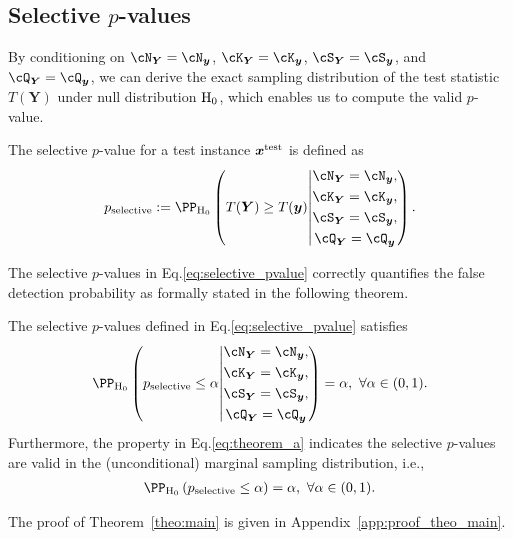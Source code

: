 \subsection{Selective $p$-values}
%
By conditioning on
$\cN_{\bm Y} = \cN_{\bm y}$,
$\cK_{\bm Y} = \cK_{\bm y}$,
$\cS_{\bm Y} = \cS_{\bm y}$,
and 
$\cQ_{\bm Y} = \cQ_{\bm y}$,
we can derive the exact sampling distribution of the test statistic $T(\bm Y)$ under null distribution ${\rm H}_0$, which enables us to compute the valid $p$-value.
%
\begin{definition}
 The selective $p$-value for a test instance $\bm x^{\rm test}$ is defined as
 \begin{align}
  \label{eq:selective_pvalue}
  p_{\rm selective}
  :=
  \PP_{\rm H_0}
  \left(
  T(\bm Y) \ge T(\bm y)
  \middle |
  \begin{gathered}
   \cN_{\bm{Y}} = \cN_{\bm{y}},\\
   \cK_{\bm{Y}} = \cK_{\bm{y}},\\
   \cS_{\bm{Y}} = \cS_{\bm{y}},\\
   \cQ_{\bm{Y}} = \cQ_{\bm{y}}
  \end{gathered}
  \right).
 \end{align}
\end{definition}
%
The selective $p$-values in Eq.\eqref{eq:selective_pvalue} correctly quantifies the false detection probability as formally stated in the following theorem.
%
\begin{theorem}
 \label{theo:main}
 The selective $p$-values defined in Eq.\eqref{eq:selective_pvalue} satisfies
 \begin{align}
  \label{eq:theorem_a}
  \PP_{\rm H_0}
  \left(
  p_{\rm selective}
  \le
  \alpha
  \middle |
  \begin{gathered}
   \cN_{\bm{Y}} = \cN_{\bm{y}},\\
   \cK_{\bm{Y}} = \cK_{\bm{y}},\\
   \cS_{\bm{Y}} = \cS_{\bm{y}},\\
   \cQ_{\bm{Y}} = \cQ_{\bm{y}}
  \end{gathered}
  \right)
  =
  \alpha,
  ~
  \forall \alpha \in (0, 1).
 \end{align}
 Furthermore, the property in Eq.\eqref{eq:theorem_a} indicates the selective $p$-values are valid in the (unconditional) marginal sampling distribution, i.e., 
 \begin{align}
  \label{eq:theorem_b}
  \PP_{\rm H_0}
  \left(
  p_{\rm selective}
  \le
  \alpha
  \right)
  =
  \alpha,
  ~
  \forall \alpha \in (0, 1).
 \end{align}
\end{theorem}
%
The proof of Theorem~\ref{theo:main} is given in Appendix~\ref{app:proof_theo_main}.

